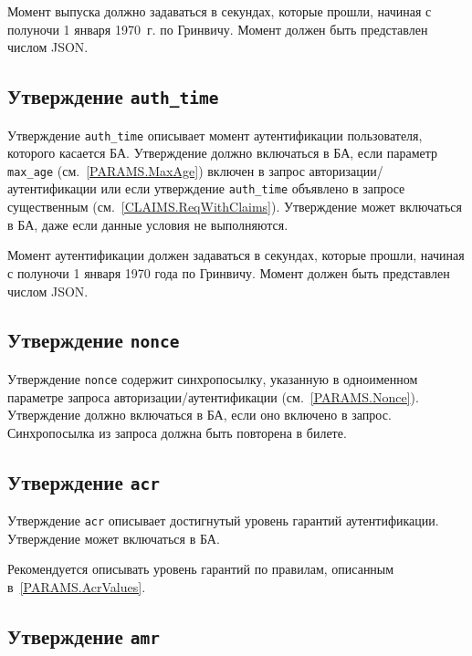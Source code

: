 Момент выпуска должно задаваться в секундах, которые прошли, начиная с полуночи
1 января 1970~г. по Гринвичу. Момент должен быть представлен числом JSON.

\subsection{Утверждение \lstinline{auth_time}}\label{CLAIMS.AuthTime}

Утверждение \lstinline{auth_time} описывает момент аутентификации пользователя, 
которого касается БА. Утверждение должно включаться в БА, если параметр 
\lstinline{max_age} (см.~\ref{PARAMS.MaxAge}) включен в запрос 
авторизации/аутентификации или если утверждение \lstinline{auth_time} 
объявлено в запросе существенным (см.~\ref{CLAIMS.ReqWithClaims}).
%
Утверждение может включаться в БА, даже если данные условия не выполняются.

Момент аутентификации должен задаваться в секундах, которые прошли, 
начиная с полуночи 1 января 1970 года по Гринвичу. Момент должен быть 
представлен числом JSON. 

\subsection{Утверждение \lstinline{nonce}}\label{CLAIMS.Nonce}

Утверждение \lstinline{nonce} содержит синхропосылку, указанную в 
одноименном параметре запроса авторизации/аутентификации 
(см.~\ref{PARAMS.Nonce}).
%
Утверждение должно включаться в БА, если оно включено в запрос.
%
Синхропосылка из запроса должна быть повторена в билете.


\subsection{Утверждение \lstinline{acr}}\label{CLAIMS.Acr}

Утверждение \lstinline{acr} описывает достигнутый уровень гарантий 
аутентификации. 
%
Утверждение может включаться в БА.

Рекомендуется описывать уровень гарантий по правилам, описанным 
в~\ref{PARAMS.AcrValues}.

\subsection{Утверждение \lstinline{amr}}\label{CLAIMS.Amr}

